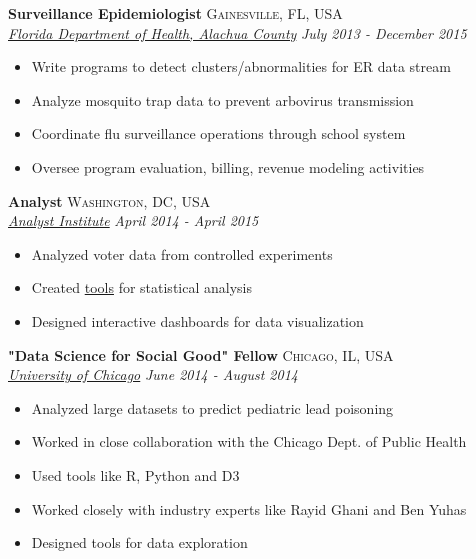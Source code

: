 \documentclass[11pt]{article}
\begin{document}
\noindent \textbf{Surveillance Epidemiologist} \hfill \textsc{Gainesville, FL, USA}\\
\noindent \emph{\href{http://alachua.floridahealth.gov/}{Florida Department of Health, Alachua County}} \hfill \emph{July 2013 - December 2015}
\vspace{-2mm}
\begin{itemize}\itemsep0pt \parskip0pt 
\item Write programs to detect clusters/abnormalities for ER data stream
\item Analyze mosquito trap data to prevent arbovirus transmission
\item Coordinate flu surveillance operations through school system
\item Oversee program evaluation, billing, revenue modeling activities
\end{itemize}

\noindent \textbf{Analyst} \hfill \textsc{Washington, DC, USA}\\
\noindent \emph{\href{https://analystinstitute.org/}{Analyst Institute}} \hfill \emph{April 2014 - April 2015}
\vspace{-2mm}
\begin{itemize}\itemsep0pt \parskip0pt 
\item Analyzed voter data from controlled experiments
\item Created \href{https://analystinstitute.org/power-calculator/}{tools} for statistical analysis 
\item Designed interactive dashboards for data visualization
\end{itemize}


\noindent \textbf{"Data Science for Social Good" Fellow} \hfill \textsc{Chicago, IL, USA}\\
\noindent \emph{\href{http://www.uchicago.edu/}{University of Chicago}} \hfill \emph{June 2014 - August 2014}
\vspace{-2mm}
\begin{itemize}\itemsep0pt \parskip0pt 
\item Analyzed large datasets to predict pediatric lead poisoning
\item Worked in close collaboration with the Chicago Dept. of Public Health
\item Used tools like R, Python and D3
\item Worked closely with industry experts like Rayid Ghani and Ben Yuhas
\item Designed tools for data exploration
\end{itemize}
\end{document}
